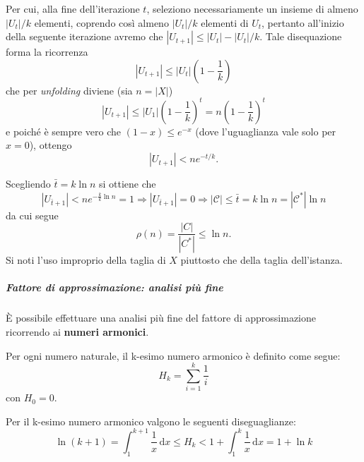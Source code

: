 Per cui, alla fine dell'iterazione $t$, seleziono necessariamente un insieme di almeno $|U_t|/k$ elementi, coprendo così almeno $|U_t|/k$ elementi di $U_t$, pertanto all'inizio della seguente iterazione avremo che $|U_{t+1}|\leq |U_t|-|U_t|/k$. Tale disequazione forma la ricorrenza
\[
|U_{t+1}| \leq |U_t|\left(1-\frac{1}{k}\right)
\]
che per \textit{unfolding} diviene (sia $n=|X|$)
\[
|U_{t+1}| \leq |U_1|\left(1-\frac{1}{k}\right)^t = n\left(1-\frac{1}{k}\right)^t
\]
e poiché è sempre vero che $(1-x)\leq e^{-x}$ (dove l'uguaglianza vale solo per $x=0$), ottengo
\[
|U_{t+1}| < ne^{-t/k}.
\]

Scegliendo $\bar{t} = k\ln{n}$ si ottiene che
\[
|U_{\bar{t}+1}| < ne^{-\frac{k}{k}\ln{n}} = 1 \Rightarrow |U_{\bar{t}+1}| = 0 \Rightarrow |\mathcal{C}| \leq \bar{t} = k\ln{n} = |\mathcal{C^*}|\ln{n}
\]
da cui segue
\[
\rho (n) = \frac{|C|}{|C^*|} \leq \ln{n}.
\]
Si noti l'uso improprio della taglia di $X$ piuttosto che della taglia dell'istanza.

\subparagraph{Fattore di approssimazione: analisi più fine} È possibile effettuare una analisi più fine del fattore di approssimazione ricorrendo ai \textbf{numeri armonici}.

\begin{definizione}
Per ogni numero naturale, il k-esimo numero armonico è definito come segue:
\[
H_k = \sum_{i=1}^k \frac{1}{i}
\]
con $H_0 = 0$.
\end{definizione}

\begin{proposizione}
Per il k-esimo numero armonico valgono le seguenti diseguaglianze:
\[
\ln{(k+1)} = \int_1^{k+1} \! \frac{1}{x}\,\mathrm{d}x \leq H_k < 1 + \int_1^k \! \frac{1}{x}\,\mathrm{d}x = 1 + \ln{k}
\]
\end{proposizione}

